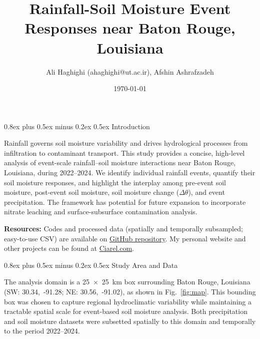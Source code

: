 \documentclass[9pt, twocolumn]{extarticle}
\title{Rainfall-Soil Moisture Event Responses near Baton Rouge, Louisiana}
\author{%
  \large Ali Haghighi \normalsize{(ahaghighi@ut.ac.ir)}\large, Afshin Ashrafzadeh
}
\date{\large \today}
\makeatletter
\renewcommand\section{\@startsection{section}{1}{0pt}%
  {0.8ex plus 0.5ex minus 0.2ex}%
  {0.5ex}%
  {\normalfont\Large\bfseries}}
\renewcommand{\maketitle}{\bgroup\setlength{\parindent}{0pt}
\vspace*{-\topskip}%
\begin{flushleft}
  \huge\textbf{\@title}

  \vspace{0.20cm}

  \normalsize\@author \hfill \normalsize\@date

  \vspace{0.25cm}\hrule\vspace{0.25cm}
\end{flushleft}
\egroup}
\makeatother
\begin{document}
\twocolumn[
  \begin{@twocolumnfalse}
    \maketitle
  \end{@twocolumnfalse}
]


\section{Introduction}

Rainfall governs soil moisture variability and drives hydrological processes from infiltration to contaminant transport. This study provides a concise, high-level analysis of event-scale rainfall–soil moisture interactions near Baton Rouge, Louisiana, during 2022–2024. We identify individual rainfall events, quantify their soil moisture responses, and highlight the interplay among pre-event soil moisture, post-event soil moisture, soil moisture change ($\Delta \theta$), and event precipitation. The framework has potential for future expansion to incorporate nitrate leaching and surface-subsurface contamination analysis.

\noindent\textbf{Resources: }
Codes and processed data (spatially and temporally subsampled; easy-to-use CSV) are available on \href{https://github.com/Alioax/rainfall-soil-moisture/}{GitHub repository}. 
My personal website and other projects can be found at \href{https://ciarel.com}{Ciarel.com}.


\section{Study Area and Data}

The analysis domain is a 25~$\times$~25~km box surrounding Baton Rouge, Louisiana (SW: 30.34,~-91.28; NE: 30.56,~-91.02), as shown in Fig.~\ref{fig:map}. This bounding box was chosen to capture regional hydroclimatic variability while maintaining a tractable spatial scale for event-based soil moisture analysis. Both precipitation and soil moisture datasets were subsetted spatially to this domain and temporally to the period 2022--2024.
\end{document}
